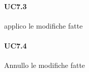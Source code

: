 	\paragraph{UC7.3}
	applico le modifiche fatte
	
	\paragraph{UC7.4}
	Annullo le modifiche fatte
	\iffalse %
	\paragraph{UC7.2}
	aggiornamento delle preferenze
	\subparagraph{UC7.2.1}
	modifica calendario:
	dato il calendario lavorativo l'utente modifica i giorni disponibili
	\subparagraph{UC7.2.2}
	cambio piattaforma di messaggistica
	telegram: modifica nickname
	slack: modifica nickname
	mail: modifica email
	\fi
			
		
		
		

